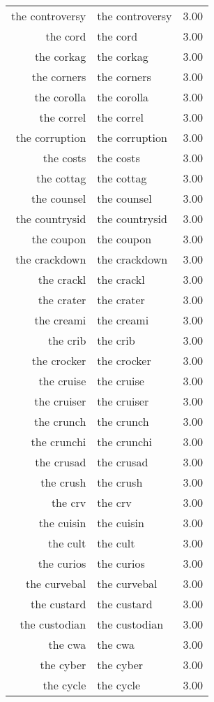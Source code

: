 \begin{table}[ht]
\begin{tabular}{rlr}
  the controversy & the controversy & 3.00 \\ 
  the cord & the cord & 3.00 \\ 
  the corkag & the corkag & 3.00 \\ 
  the corners & the corners & 3.00 \\ 
  the corolla & the corolla & 3.00 \\ 
  the correl & the correl & 3.00 \\ 
  the corruption & the corruption & 3.00 \\ 
  the costs & the costs & 3.00 \\ 
  the cottag & the cottag & 3.00 \\ 
  the counsel & the counsel & 3.00 \\ 
  the countrysid & the countrysid & 3.00 \\ 
  the coupon & the coupon & 3.00 \\ 
  the crackdown & the crackdown & 3.00 \\ 
  the crackl & the crackl & 3.00 \\ 
  the crater & the crater & 3.00 \\ 
  the creami & the creami & 3.00 \\ 
  the crib & the crib & 3.00 \\ 
  the crocker & the crocker & 3.00 \\ 
  the cruise & the cruise & 3.00 \\ 
  the cruiser & the cruiser & 3.00 \\ 
  the crunch & the crunch & 3.00 \\ 
  the crunchi & the crunchi & 3.00 \\ 
  the crusad & the crusad & 3.00 \\ 
  the crush & the crush & 3.00 \\ 
  the crv & the crv & 3.00 \\ 
  the cuisin & the cuisin & 3.00 \\ 
  the cult & the cult & 3.00 \\ 
  the curios & the curios & 3.00 \\ 
  the curvebal & the curvebal & 3.00 \\ 
  the custard & the custard & 3.00 \\ 
  the custodian & the custodian & 3.00 \\ 
  the cwa & the cwa & 3.00 \\ 
  the cyber & the cyber & 3.00 \\ 
  the cycle & the cycle & 3.00 \\ 

\end{tabular}
\end{table}
